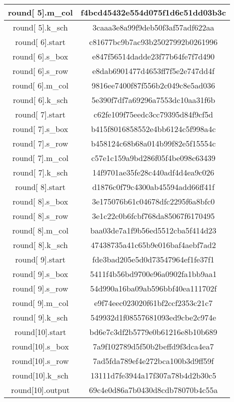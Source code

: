\begin{center}
\begin{longtable}{ |c|c| }
\hline
round[ 5].m\_col  & f4bcd45432e554d075f1d6c51dd03b3c\\
\hline
round[ 5].k\_sch  & 3caaa3e8a99f9deb50f3af57adf622aa\\
\hline
round[ 6].start  & c81677bc9b7ac93b25027992b0261996\\
\hline
round[ 6].s\_box  & e847f56514dadde23f77b64fe7f7d490\\
\hline
round[ 6].s\_row  & e8dab6901477d4653ff7f5e2e747dd4f\\
\hline
round[ 6].m\_col  & 9816ee7400f87f556b2c049c8e5ad036\\
\hline
round[ 6].k\_sch  & 5e390f7df7a69296a7553dc10aa31f6b\\
\hline
round[ 7].start  & c62fe109f75eedc3cc79395d84f9cf5d\\
\hline
round[ 7].s\_box  & b415f8016858552e4bb6124c5f998a4c\\
\hline
round[ 7].s\_row  & b458124c68b68a014b99f82e5f15554c\\
\hline
round[ 7].m\_col  & c57e1c159a9bd286f05f4be098c63439\\
\hline
round[ 7].k\_sch  & 14f9701ae35fe28c440adf4d4ea9c026\\
\hline
round[ 8].start  & d1876c0f79c4300ab45594add66ff41f\\
\hline
round[ 8].s\_box  & 3e175076b61c04678dfc2295f6a8bfc0\\
\hline
round[ 8].s\_row  & 3e1c22c0b6fcbf768da85067f6170495\\
\hline
round[ 8].m\_col  & baa03de7a1f9b56ed5512cba5f414d23\\
\hline
round[ 8].k\_sch  & 47438735a41c65b9e016baf4aebf7ad2\\
\hline
round[ 9].start  & fde3bad205e5d0d73547964ef1fe37f1\\
\hline
round[ 9].s\_box  & 5411f4b56bd9700e96a0902fa1bb9aa1\\
\hline
round[ 9].s\_row  & 54d990a16ba09ab596bbf40ea111702f\\
\hline
round[ 9].m\_col  & e9f74eec023020f61bf2ccf2353c21c7\\
\hline
round[ 9].k\_sch  & 549932d1f08557681093ed9cbe2c974e\\
\hline
round[10].start   & bd6e7c3df2b5779e0b61216e8b10b689\\
\hline
round[10].s\_box  & 7a9f102789d5f50b2beffd9f3dca4ea7\\
\hline
round[10].s\_row  & 7ad5fda789ef4e272bca100b3d9ff59f\\
\hline
round[10].k\_sch  & 13111d7fe3944a17f307a78b4d2b30c5\\
\hline
round[10].output & 69c4e0d86a7b0430d8cdb78070b4c55a\\
\hline

\end{longtable}
\end{center}


